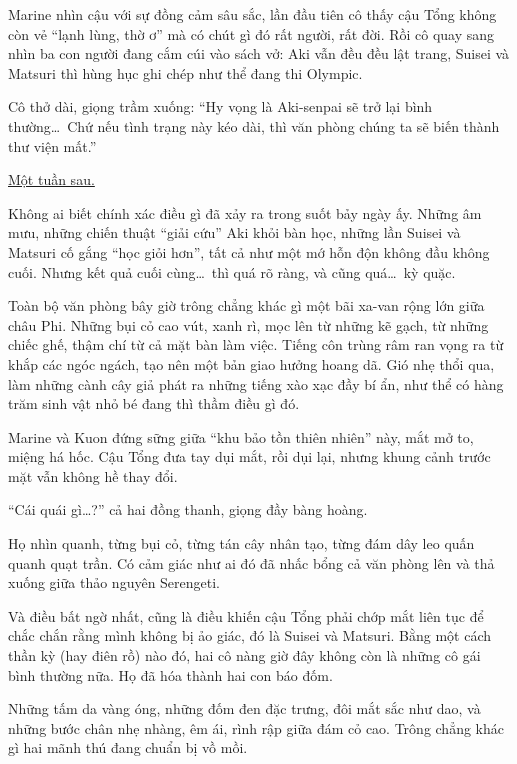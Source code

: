 \documentclass[../main.tex]{subfiles}
\begin{document}
Marine nhìn cậu với sự đồng cảm sâu sắc, lần đầu tiên cô thấy cậu Tổng không còn vẻ ``lạnh lùng, thờ ơ'' mà có chút gì đó rất người, rất đời. Rồi cô quay sang nhìn ba con người đang cắm cúi vào sách vở: Aki vẫn đều đều lật trang, Suisei và Matsuri thì hùng hục ghi chép như thể đang thi Olympic.

Cô thở dài, giọng trầm xuống: ``Hy vọng là Aki-senpai sẽ trở lại bình thường\dots\ Chứ nếu tình trạng này kéo dài, thì văn phòng chúng ta sẽ biến thành thư viện mất.''

\ct

\begin{center}
  \uline{Một tuần sau.}
\end{center}

Không ai biết chính xác điều gì đã xảy ra trong suốt bảy ngày ấy. Những âm mưu, những chiến thuật ``giải cứu'' Aki khỏi bàn học, những lần Suisei và Matsuri cố gắng ``học giỏi hơn'', tất cả như một mớ hỗn độn không đầu không cuối. Nhưng kết quả cuối cùng\dots\ thì quá rõ ràng, và cũng quá\dots\ kỳ quặc.

Toàn bộ văn phòng \hll bây giờ trông chẳng khác gì một bãi xa-van rộng lớn giữa châu Phi. Những bụi cỏ cao vút, xanh rì, mọc lên từ những kẽ gạch, từ những chiếc ghế, thậm chí từ cả mặt bàn làm việc. Tiếng côn trùng râm ran vọng ra từ khắp các ngóc ngách, tạo nên một bản giao hưởng hoang dã. Gió nhẹ thổi qua, làm những cành cây giả phát ra những tiếng xào xạc đầy bí ẩn, như thể có hàng trăm sinh vật nhỏ bé đang thì thầm điều gì đó.


Marine và Kuon đứng sững giữa ``khu bảo tồn thiên nhiên'' này, mắt mở to, miệng há hốc. Cậu Tổng đưa tay dụi mắt, rồi dụi lại, nhưng khung cảnh trước mặt vẫn không hề thay đổi.

``Cái quái gì\dots?'' cả hai đồng thanh, giọng đầy bàng hoàng.

Họ nhìn quanh, từng bụi cỏ, từng tán cây nhân tạo, từng đám dây leo quấn quanh quạt trần. Có cảm giác như ai đó đã nhấc bổng cả văn phòng lên và thả xuống giữa thảo nguyên Serengeti.

Và điều bất ngờ nhất, cũng là điều khiến cậu Tổng phải chớp mắt liên tục để chắc chắn rằng mình không bị ảo giác, đó là Suisei và Matsuri. Bằng một cách thần kỳ (hay điên rồ) nào đó, hai cô nàng giờ đây không còn là những cô gái bình thường nữa. Họ đã hóa thành hai con báo đốm.

Những tấm da vàng óng, những đốm đen đặc trưng, đôi mắt sắc như dao, và những bước chân nhẹ nhàng, êm ái, rình rập giữa đám cỏ cao. Trông chẳng khác gì hai mãnh thú đang chuẩn bị vồ mồi.
\end{document}
